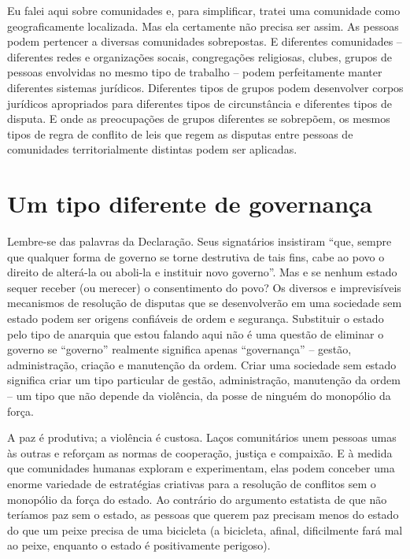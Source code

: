 Eu falei aqui sobre comunidades e, para simplificar, tratei uma comunidade como geograficamente localizada. Mas ela certamente não precisa ser assim. As pessoas podem pertencer a diversas comunidades sobrepostas. E diferentes comunidades -- diferentes redes e organizações socais, congregações religiosas, clubes, grupos de pessoas envolvidas no mesmo tipo de trabalho -- podem perfeitamente manter diferentes sistemas jurídicos. Diferentes tipos de grupos podem desenvolver corpos jurídicos apropriados para diferentes tipos de circunstância e diferentes tipos de disputa. E onde as preocupações de grupos diferentes se sobrepõem, os mesmos tipos de regra de conflito de leis que regem as disputas entre pessoas de comunidades territorialmente distintas podem ser aplicadas.

\section{Um tipo diferente de governança}

Lembre-se das palavras da Declaração. Seus signatários insistiram ``que, sempre que qualquer forma de governo se torne destrutiva de tais fins, cabe ao povo o direito de alterá-la ou aboli-la e instituir novo governo''. Mas e se nenhum estado sequer receber (ou merecer) o consentimento do povo? Os diversos e imprevisíveis mecanismos de resolução de disputas que se desenvolverão em uma sociedade sem estado podem ser origens confiáveis de ordem e segurança. Substituir o estado pelo tipo de anarquia que estou falando aqui não é uma questão de eliminar o governo se ``governo'' realmente significa apenas ``governança'' -- gestão, administração, criação e manutenção da ordem. Criar uma sociedade sem estado significa criar um tipo particular de gestão, administração, manutenção da ordem -- um tipo que não depende da violência, da posse de ninguém do monopólio da força.

A paz é produtiva; a violência é custosa. Laços comunitários unem pessoas umas às outras e reforçam as normas de cooperação, justiça e compaixão. E à medida que comunidades humanas exploram e experimentam, elas podem conceber uma enorme variedade de estratégias criativas para a resolução de conflitos sem o monopólio da força do estado. Ao contrário do argumento estatista de que não teríamos paz sem o estado, as pessoas que querem paz precisam menos do estado do que um peixe precisa de uma bicicleta (a bicicleta, afinal, dificilmente fará mal ao peixe, enquanto o estado é positivamente perigoso).

